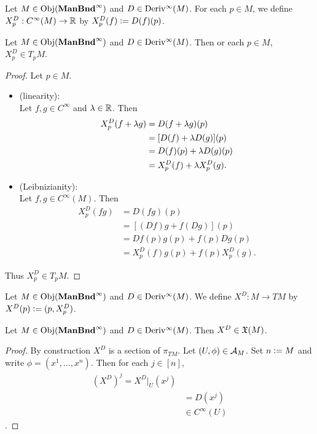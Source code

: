 \documentclass{book}
\begin{document}
\begin{defn}
	Let $M \in \operatorname{Obj}(\operatorname*{\text{\textbf{ManBnd}}^{\infty}})$ and $D \in \operatorname{Deriv^{\infty}}(M)$. For each $p \in M$, we define $X^D_p : C^{\infty}(M) \rightarrow \mathbb{R}$ by $X^D_p(f) \vcentcolon= D(f)(p)$.
\end{defn}

\begin{ex}
	Let $M \in \operatorname{Obj}(\operatorname*{\text{\textbf{ManBnd}}^{\infty}})$ and $D \in \operatorname{Deriv^{\infty}}(M)$. Then or each $p \in M$, $X^D_p \in T_pM$.
\end{ex}

\begin{proof}
	Let $p \in M$.
	\begin{itemize}
		\item (linearity): \\
		Let $f, g \in C^{\infty}$ and $\lambda \in \mathbb{R}$. Then 
		\begin{align*}
			X^D_p(f + \lambda g)
			& = D(f + \lambda g)(p) \\
			& = [D(f) + \lambda D(g)](p) \\
			& = D(f)(p) + \lambda D(g)(p) \\
			& = X^D_p(f) + \lambda X^D_p(g).
		\end{align*}
		\item (Leibnizianity): \\
		Let $f,g \in C^{\infty}(M)$. Then 
		\begin{align*}
			X^D_p(fg)
			& = D(fg)(p) \\
			& = [(Df)g + f(Dg)](p) \\
			& = Df(p)g(p) + f(p)Dg(p) \\
			& = X^D_p(f)g(p) + f(p)X^D_p(g).
		\end{align*}
	\end{itemize}
	Thus $X^D_p \in T_pM$. 
\end{proof}

\begin{defn}
	Let $M \in \operatorname{Obj}(\operatorname*{\text{\textbf{ManBnd}}^{\infty}})$ and $D \in \operatorname{Deriv^{\infty}}(M)$. We define $X^D:M \rightarrow TM$ by $X^D(p) \vcentcolon= (p, X^D_p)$.
\end{defn}

\begin{ex}
	Let $M \in \operatorname{Obj}(\operatorname*{\text{\textbf{ManBnd}}^{\infty}})$ and $D \in \operatorname{Deriv^{\infty}}(M)$. Then $X^D \in \mathfrak{X}(M)$.
\end{ex}

\begin{proof}
	By construction $X^D$ is a section of $\pi_{TM}$. Let $(U, \phi) \in \mathcal{A}_M$. Set $n \vcentcolon= M$ and write $\phi = (x^1, \ldots, x^n)$. Then for each $j \in [n]$, 
	\begin{align*}
		(X^D)^j
		= X^D|_U(x^j) \\
		& = D(x^j) \\
		& \in C^{\infty}(U)
	\end{align*}
	.
\end{proof}
\end{document}
